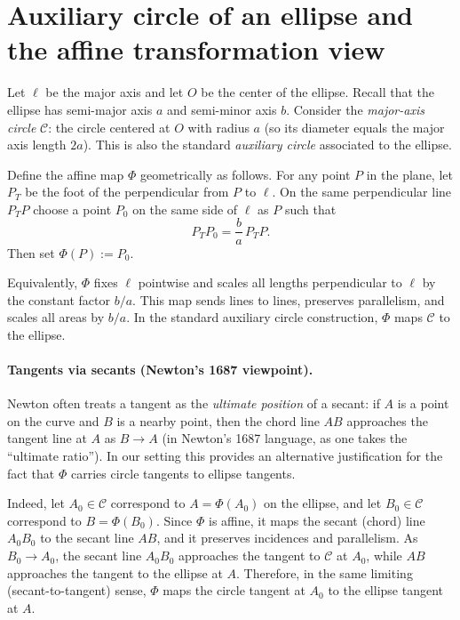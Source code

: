 \section{Auxiliary circle of an ellipse and the affine transformation view}

Let $\ell$ be the major axis and let $O$ be the center of the ellipse. Recall that the ellipse has semi-major axis $a$ and semi-minor axis $b$. Consider the \emph{major-axis circle} $\mathcal C$: the circle centered at $O$ with radius $a$ (so its diameter equals the major axis length $2a$). This is also the standard \emph{auxiliary circle} associated to the ellipse.

Define the affine map $\Phi$ geometrically as follows. For any point $P$ in the plane, let $P_T$ be the foot of the perpendicular from $P$ to $\ell$. On the same perpendicular line $P_TP$ choose a point $P_0$ on the same side of $\ell$ as $P$ such that
\begin{equation}
  P_TP_0=\frac{b}{a}\,P_TP.
\end{equation}
Then set $\Phi(P):=P_0$.

Equivalently, $\Phi$ fixes $\ell$ pointwise and scales all lengths perpendicular to $\ell$ by the constant factor $b/a$. This map sends lines to lines, preserves parallelism, and scales all areas by $b/a$. In the standard auxiliary circle construction, $\Phi$ maps $\mathcal C$ to the ellipse.

\paragraph{Tangents via secants (Newton's 1687 viewpoint).}
Newton often treats a tangent as the \emph{ultimate position} of a secant: if $A$ is a point on the curve and $B$ is a nearby point, then the chord line $AB$ approaches the tangent line at $A$ as $B\to A$ (in Newton's 1687 language, as one takes the ``ultimate ratio''). In our setting this provides an alternative justification for the fact that $\Phi$ carries circle tangents to ellipse tangents.

Indeed, let $A_0\in\mathcal C$ correspond to $A=\Phi(A_0)$ on the ellipse, and let $B_0\in\mathcal C$ correspond to $B=\Phi(B_0)$. Since $\Phi$ is affine, it maps the secant (chord) line $A_0B_0$ to the secant line $AB$, and it preserves incidences and parallelism. As $B_0\to A_0$, the secant line $A_0B_0$ approaches the tangent to $\mathcal C$ at $A_0$, while $AB$ approaches the tangent to the ellipse at $A$. Therefore, in the same limiting (secant-to-tangent) sense, $\Phi$ maps the circle tangent at $A_0$ to the ellipse tangent at $A$.

